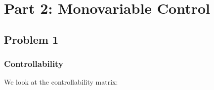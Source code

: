 \section{Part 2: Monovariable Control}

\subsection{Problem 1}
\subsubsection{Controllability}
We look at the controllability matrix:

